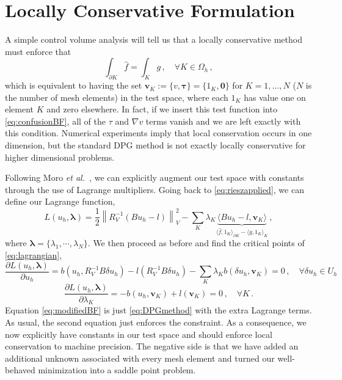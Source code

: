 \documentclass[letterpaper]{article}
\def\btau{\boldsymbol\tau}
\def\blambda{\boldsymbol\lambda}
\newcommand{\eqnref}[1]{\eqref{eq:#1}}
\newcommand{\norm}[1]{\left\| #1 \right\|}
\def\etal{{\it et al.~}}
\newcommand{\grad}{\nabla}
\begin{document}
\section{Locally Conservative Formulation}
A simple control volume analysis will tell us that a locally conservative
method must enforce that
\begin{equation}
\int_{\partial K}\hat f=\int_K g\,,\quad\forall K\in\Omega_h\,,
\label{eq:localconservation}
\end{equation}
which is equivalent to having the set
$\mathbf{v}_K:=\{v,\btau\}=\{1_K,\boldsymbol0\}$ for $K=1,\dots,N$ ($N$ is the
number of mesh elements)
in the test space, where each $1_K$ has value one on element $K$ and zero
elsewhere.  In fact, if we insert this test function into
\eqnref{confusionBF}, all of the $\tau$ and $\grad v$ terms vanish and we are
left exactly with this condition.
Numerical experiments imply that local conservation occurs in one dimension,
but the standard DPG method is not exactly locally conservative for higher
dimensional problems.

Following Moro \etal\cite{MoroNguyenPeraire11}, we can explicitly augment our
test space with constants through the use of Lagrange multipliers. Going back
to \eqnref{rieszapplied}, we can define our Lagrange function,
\begin{equation}
\label{eq:lagrangian}
L(u_h,\blambda) = \frac{1}{2}\norm{R_V^{-1}(Bu_h-l)}_V^2
-\sum_K\lambda_K\underbrace{\langle Bu_h-l,\mathbf{v}_K\rangle}_
{\langle\hat f, 1_K\rangle_{\partial K}-\langle g,1_K\rangle_K}\,,
\end{equation}
where $\blambda=\{\lambda_1,\cdots,\lambda_N\}$.
We then proceed as before and find the critical points of \eqnref{lagrangian},
\begin{equation}
\label{eq:modifiedBF}
\frac{\partial L(u_h,\blambda)}{\partial u_h}=b(u_h,R_V^{-1}B\delta u_h)
-l(R_V^{-1}B\delta u_h)
-\sum_K\lambda_K b(\delta
u_h,\mathbf{v}_K)=0\,,\quad\forall\delta u_h\in U_h
\end{equation}
\begin{equation}
\label{eq:constraint}
\frac{\partial
L(u_h,\blambda)}{\partial\lambda_K}=-b(u_h,\mathbf{v}_K)+l(\mathbf{v}_K)=0\,,\quad\forall
K\,.
\end{equation}
Equation \eqnref{modifiedBF} is just \eqnref{DPGmethod} with the extra
Lagrange terms. As usual, the second equation just enforces the constraint. As
a consequence, we now explicitly have constants in our test space and should
enforce local conservation to machine precision. The negative side is that we
have added an additional unknown associated with every mesh element and turned
our well-behaved minimization into a saddle point problem.
\end{document}
